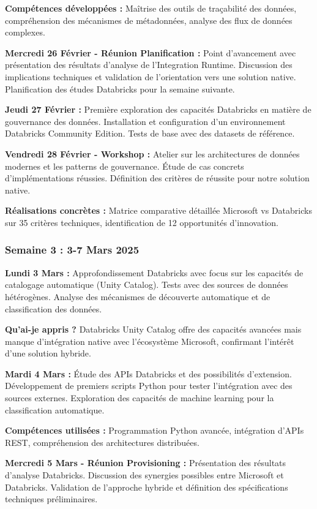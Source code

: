 \documentclass[a4paper,12pt]{article}
\begin{document}
\textbf{Compétences développées :} Maîtrise des outils de traçabilité des données, compréhension des mécanismes de métadonnées, analyse des flux de données complexes.

\textbf{Mercredi 26 Février - Réunion Planification :}
Point d'avancement avec présentation des résultats d'analyse de l'Integration Runtime. Discussion des implications techniques et validation de l'orientation vers une solution native. Planification des études Databricks pour la semaine suivante.

\textbf{Jeudi 27 Février :}
Première exploration des capacités Databricks en matière de gouvernance des données. Installation et configuration d'un environnement Databricks Community Edition. Tests de base avec des datasets de référence.

\textbf{Vendredi 28 Février - Workshop :}
Atelier sur les architectures de données modernes et les patterns de gouvernance. Étude de cas concrets d'implémentations réussies. Définition des critères de réussite pour notre solution native.

\textbf{Réalisations concrètes :} Matrice comparative détaillée Microsoft vs Databricks sur 35 critères techniques, identification de 12 opportunités d'innovation.

\subsubsection{Semaine 3 : 3-7 Mars 2025}

\textbf{Lundi 3 Mars :}
Approfondissement Databricks avec focus sur les capacités de catalogage automatique (Unity Catalog). Tests avec des sources de données hétérogènes. Analyse des mécanismes de découverte automatique et de classification des données.

\textbf{Qu'ai-je appris ?} Databricks Unity Catalog offre des capacités avancées mais manque d'intégration native avec l'écosystème Microsoft, confirmant l'intérêt d'une solution hybride.

\textbf{Mardi 4 Mars :}
Étude des APIs Databricks et des possibilités d'extension. Développement de premiers scripts Python pour tester l'intégration avec des sources externes. Exploration des capacités de machine learning pour la classification automatique.

\textbf{Compétences utilisées :} Programmation Python avancée, intégration d'APIs REST, compréhension des architectures distribuées.

\textbf{Mercredi 5 Mars - Réunion Provisioning :}
Présentation des résultats d'analyse Databricks. Discussion des synergies possibles entre Microsoft et Databricks. Validation de l'approche hybride et définition des spécifications techniques préliminaires.
\end{document}
